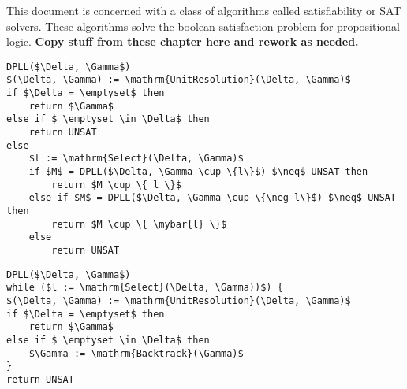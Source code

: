 This document is concerned with a class of algorithms called satisfiability or SAT solvers.
These algorithms solve the boolean satisfaction problem for propositional logic. 
\textbf{Copy stuff from these chapter here and rework as needed.}

\begin{lstlisting}[caption = Example Recursive DPLL Algorithm,mathescape, label = cl:dpllalg]
DPLL($\Delta, \Gamma$)
$(\Delta, \Gamma) := \mathrm{UnitResolution}(\Delta, \Gamma)$
if $\Delta = \emptyset$ then
    return $\Gamma$
else if $ \emptyset \in \Delta$ then
    return UNSAT
else
    $l := \mathrm{Select}(\Delta, \Gamma)$
    if $M$ = DPLL($\Delta, \Gamma \cup \{l\}$) $\neq$ UNSAT then
        return $M \cup \{ l \}$ 
    else if $M$ = DPLL($\Delta, \Gamma \cup \{\neg l\}$) $\neq$ UNSAT then 
        return $M \cup \{ \mybar{l} \}$ 
    else
        return UNSAT
\end{lstlisting}

\begin{lstlisting}[caption = Example Recursive DPLL Algorithm,mathescape, label = cl:dpllalg]
DPLL($\Delta, \Gamma$)
while ($l := \mathrm{Select}(\Delta, \Gamma))$) {
$(\Delta, \Gamma) := \mathrm{UnitResolution}(\Delta, \Gamma)$
if $\Delta = \emptyset$ then
    return $\Gamma$
else if $ \emptyset \in \Delta$ then
    $\Gamma := \mathrm{Backtrack}(\Gamma)$
}
return UNSAT
\end{lstlisting}

